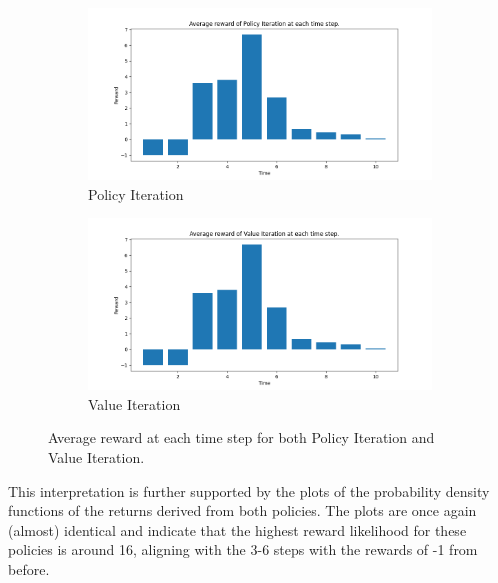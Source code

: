 \documentclass{class}
\begin{document}
\begin{figure}[H]
    \centering
    \begin{subfigure}[t]{0.48\linewidth}
        \centering
        \includegraphics[width=\linewidth]{../plots/r_over_time/policy_iteration_r_over_time.png}
        \caption{Policy Iteration}
        \label{fig:policy_iteration_r_over_time}
    \end{subfigure}
    \hfill
    \begin{subfigure}[t]{0.48\linewidth}
        \centering
        \includegraphics[width=\linewidth]{../plots/r_over_time/value_iteration_r_over_time.png}
        \caption{Value Iteration}
        \label{fig:value_iterations_r_over_time}
    \end{subfigure}
    \caption{Average reward at each time step for both Policy Iteration and Value Iteration.}
    \label{fig:DP_reward_comparison}
\end{figure}

\noindent This interpretation is further supported by the plots of the probability density functions of the returns derived from both policies. The plots are once again (almost) identical and indicate that the highest reward likelihood for these policies is around 16, aligning with the 3-6 steps with the rewards of -1 from before.
\end{document}
